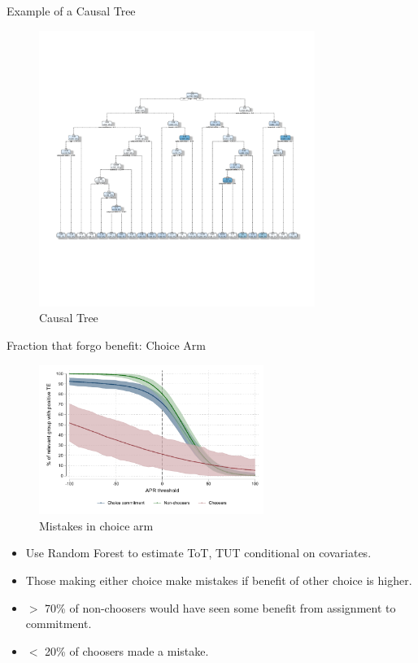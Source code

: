\documentclass[8pt]{beamer}
\begin{document}
\begin{frame}{Example of a Causal Tree}

    \begin{figure}
        \caption{Causal Tree}
        \centering
\includegraphics[width=0.8\textwidth]{Figuras/ct_eff.pdf}
        \end{figure}

\end{frame}





\begin{frame}{Fraction that forgo benefit:  Choice Arm}


    
    
        \begin{figure}
        \label{choose_wrong}
        \caption{Mistakes in choice arm}
        \centering
        \includegraphics[width=0.65\textwidth]{Figuras/line_cw_apr_tot_tut.pdf}
        \end{figure}

\begin{itemize}
    \item   Use Random Forest to estimate ToT, TUT conditional on covariates.
    \item   Those making either choice make mistakes if benefit of other choice is higher.
    \item $>$ 70\% of non-choosers would have seen some benefit from assignment to commitment.
    \item  $<$ 20\% of choosers made a mistake.
\end{itemize}        


\end{frame}
\end{document}
